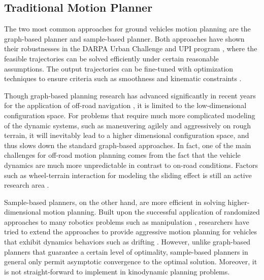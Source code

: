 \documentclass[../thesis.tex]{subfiles}
\begin{document}
\subsection{Traditional Motion Planner}
 
 
The two most common approaches for ground vehicles motion planning are the graph-based planner and sample-based planner. 
Both approaches have shown their robustnesses in the DARPA Urban Challenge \cite{koenig2002d,kuwata2008motion} and UPI program \cite{kelly2006toward,stentz2007crusher}, where the feasible trajectories can be solved efficiently under certain reasonable assumptions. 
The output trajectories can be fine-tuned with optimization techniques to ensure criteria such as smoothness and kinematic constraints \cite{dolgov2008practical}.
 
 
Though graph-based planning research has advanced significantly in recent years for the application of off-road navigation \cite{kelly2006toward,stentz2007crusher}, it is limited to the low-dimensional configuration space.
For problems that require much more complicated modeling of the dynamic systems, such as maneuvering agilely and aggressively on rough terrain, it will inevitably lead to a higher dimensional configuration space, and thus slows down the standard graph-based approaches. 
In fact, one of the main challenges for off-road motion planning comes from the fact that the vehicle dynamics are much more unpredictable in contrast to on-road conditions. 
Factors such as wheel-terrain interaction for modeling the sliding effect is still an active research area \cite{shibly2005equivalent,rubinstein2004detailed}. 
 
 
Sample-based planners, on the other hand, are more efficient in solving higher-dimensional motion planning. 
Built upon the successful application of randomized approaches to many robotics problems such as manipulation \cite{kuffner2000rrt}, researchers have tried to extend the approaches to provide aggressive motion planning for vehicles that exhibit dynamics behaviors such as drifting  \cite{hwan2011anytime}. 
However, unlike graph-based planners that guarantee a certain level of optimality, sample-based planners in general only permit asymptotic convergence to the optimal solution. 
Moreover, it is not straight-forward to implement in kinodynamic planning problems.
 
\end{document}
